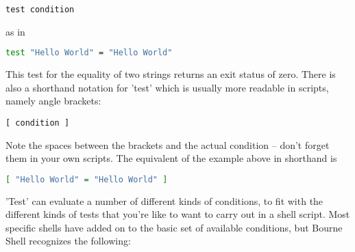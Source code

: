 \scriptsize
\begin{verbatim}
test condition
\end{verbatim}
\normalsize

as in 
\lstset{basicstyle=\scriptsize, numbers=left, captionpos=b, tabsize=4}
\begin{lstlisting}[caption=A test for string equality,language={bash},
breaklines=true,xleftmargin=15pt,label=lst:A test for string equality]
test "Hello World" = "Hello World"
\end{lstlisting}

This test for the equality of two strings returns an exit status of zero. There
is also a shorthand notation for 'test' which is usually more readable in
scripts, namely angle brackets:
\scriptsize
\begin{verbatim}
[ condition ]
\end{verbatim}
\normalsize

Note the spaces between the brackets and the actual condition -- don't forget
them in your own scripts. The equivalent of the example above in shorthand is 

\lstset{basicstyle=\scriptsize, numbers=left, captionpos=b, tabsize=4}
\begin{lstlisting}[caption=A shorter test for string equality,language={bash},
breaklines=true,xleftmargin=15pt,label=lst:A shorter test for string equality]
[ "Hello World" = "Hello World" ]
\end{lstlisting}

'Test' can evaluate a number of different kinds of conditions, to fit with the
different kinds of tests that you're like to want to carry out in a shell
script. Most specific shells have added on to the basic set of available
conditions, but Bourne Shell recognizes the following:

